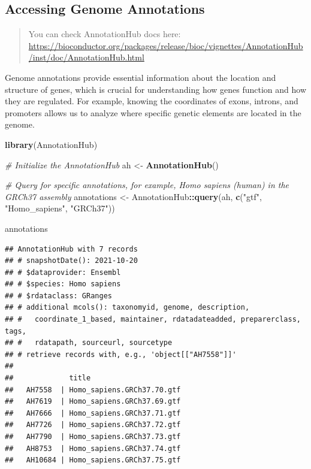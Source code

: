 \documentclass[
]{book}
\newenvironment{Shaded}{\begin{snugshade}}{\end{snugshade}}
\newcommand{\CommentTok}[1]{\textcolor[rgb]{0.56,0.35,0.01}{\textit{#1}}}
\newcommand{\FunctionTok}[1]{\textcolor[rgb]{0.13,0.29,0.53}{\textbf{#1}}}
\newcommand{\NormalTok}[1]{#1}
\newcommand{\OtherTok}[1]{\textcolor[rgb]{0.56,0.35,0.01}{#1}}
\newcommand{\SpecialCharTok}[1]{\textcolor[rgb]{0.81,0.36,0.00}{\textbf{#1}}}
\newcommand{\StringTok}[1]{\textcolor[rgb]{0.31,0.60,0.02}{#1}}
\begin{document}
\hypertarget{accessing-genome-annotations}{%
\subsection{Accessing Genome Annotations}\label{accessing-genome-annotations}}

\begin{quote}
You can check AnnotationHub docs here: \url{https://bioconductor.org/packages/release/bioc/vignettes/AnnotationHub/inst/doc/AnnotationHub.html}
\end{quote}

Genome annotations provide essential information about the location and structure of genes, which is crucial for understanding how genes function and how they are regulated. For example, knowing the coordinates of exons, introns, and promoters allows us to analyze where specific genetic elements are located in the genome.

\begin{Shaded}
\begin{Highlighting}[]
\FunctionTok{library}\NormalTok{(AnnotationHub)}

\CommentTok{\# Initialize the AnnotationHub}
\NormalTok{ah }\OtherTok{\textless{}{-}} \FunctionTok{AnnotationHub}\NormalTok{()}

\CommentTok{\# Query for specific annotations, for example, Homo sapiens (human) in the GRCh37 assembly}
\NormalTok{annotations }\OtherTok{\textless{}{-}}\NormalTok{ AnnotationHub}\SpecialCharTok{::}\FunctionTok{query}\NormalTok{(ah, }\FunctionTok{c}\NormalTok{(}\StringTok{"gtf"}\NormalTok{, }\StringTok{"Homo\_sapiens"}\NormalTok{, }\StringTok{"GRCh37"}\NormalTok{))}

\NormalTok{annotations}
\end{Highlighting}
\end{Shaded}

\begin{verbatim}
## AnnotationHub with 7 records
## # snapshotDate(): 2021-10-20
## # $dataprovider: Ensembl
## # $species: Homo sapiens
## # $rdataclass: GRanges
## # additional mcols(): taxonomyid, genome, description,
## #   coordinate_1_based, maintainer, rdatadateadded, preparerclass, tags,
## #   rdatapath, sourceurl, sourcetype 
## # retrieve records with, e.g., 'object[["AH7558"]]' 
## 
##             title                     
##   AH7558  | Homo_sapiens.GRCh37.70.gtf
##   AH7619  | Homo_sapiens.GRCh37.69.gtf
##   AH7666  | Homo_sapiens.GRCh37.71.gtf
##   AH7726  | Homo_sapiens.GRCh37.72.gtf
##   AH7790  | Homo_sapiens.GRCh37.73.gtf
##   AH8753  | Homo_sapiens.GRCh37.74.gtf
##   AH10684 | Homo_sapiens.GRCh37.75.gtf
\end{verbatim}
\end{document}
